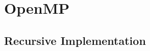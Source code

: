 \documentclass[12pt,a4paper,titlepage,oneside]{scrartcl}
\begin{document}
\maketitle
\setcounter{section}{0}
\setcounter{tocdepth}{2}
\tableofcontents
\pagebreak
%
%
\section{OpenMP}
	\subsection{Recursive Implementation}
		

\pagebreak

%
%
\end{document}
